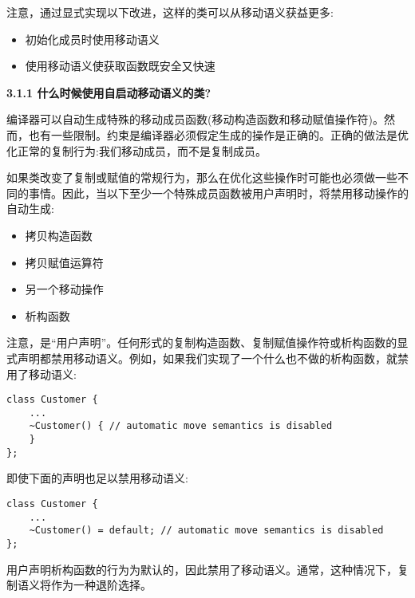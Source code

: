 注意，通过显式实现以下改进，这样的类可以从移动语义获益更多:\par

\begin{itemize}
	\item 初始化成员时使用移动语义
	\item 使用移动语义使获取函数既安全又快速
\end{itemize}

\hspace*{\fill} \par %
\textbf{3.1.1 什么时候使用自启动移动语义的类?}

编译器可以自动生成特殊的移动成员函数(移动构造函数和移动赋值操作符)。然而，也有一些限制。约束是编译器必须假定生成的操作是正确的。正确的做法是优化正常的复制行为:我们移动成员，而不是复制成员。\par

如果类改变了复制或赋值的常规行为，那么在优化这些操作时可能也必须做一些不同的事情。因此，当以下至少一个特殊成员函数被用户声明时，将禁用移动操作的自动生成:\par

\begin{itemize}
	\item 拷贝构造函数
	\item 拷贝赋值运算符
	\item 另一个移动操作
	\item 析构函数
\end{itemize}

注意，是“用户声明”。任何形式的复制构造函数、复制赋值操作符或析构函数的显式声明都禁用移动语义。例如，如果我们实现了一个什么也不做的析构函数，就禁用了移动语义:\par

\begin{lstlisting}[caption={}]
class Customer {
	...
	~Customer() { // automatic move semantics is disabled
	}
};
\end{lstlisting}

即使下面的声明也足以禁用移动语义:\par

\begin{lstlisting}[caption={}]
class Customer {
	...
	~Customer() = default; // automatic move semantics is disabled
};
\end{lstlisting}

用户声明析构函数的行为为默认的，因此禁用了移动语义。通常，这种情况下，复制语义将作为一种退阶选择。\par

